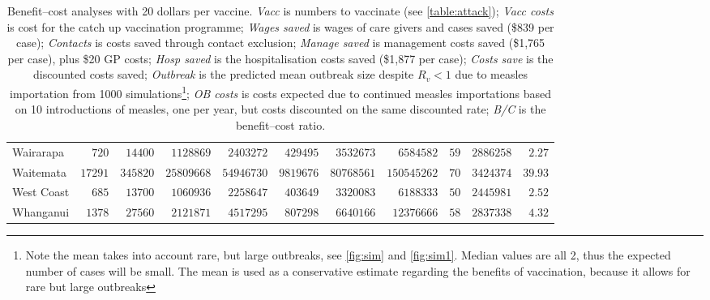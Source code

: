 \documentclass{article}
\begin{document}
\begin{table}
\begin{center}
\begin{tabular}{lrrrrrrrrrr}
Wairarapa&$  720$&$ 14400$&$ 1128869$&$ 2403272$&$  429495$&$ 3532673$&$  6584582$&$ 59$&$2886258$&$ 2.27$\tabularnewline
Waitemata&$17291$&$345820$&$25809668$&$54946730$&$ 9819676$&$80768561$&$150545262$&$ 70$&$3424374$&$39.93$\tabularnewline
West Coast&$  685$&$ 13700$&$ 1060936$&$ 2258647$&$  403649$&$ 3320083$&$  6188333$&$ 50$&$2445981$&$ 2.52$\tabularnewline
Whanganui&$ 1378$&$ 27560$&$ 2121871$&$ 4517295$&$  807298$&$ 6640166$&$ 12376666$&$ 58$&$2837338$&$ 4.32$\tabularnewline
\hline
\end{tabular}\end{center}\caption{Benefit--cost analyses with 20 dollars per vaccine. \textit{Vacc} is numbers to vaccinate (see \autoref{table:attack}); \textit{Vacc costs} is cost for the catch up vaccination programme; \textit{Wages saved} is wages of care givers and cases saved (\$839 per case); \textit{Contacts} is costs saved through contact exclusion; \textit{Manage saved} is management costs saved (\$1,765 per case), plus \$20 GP costs; \textit{Hosp saved} is the hospitalisation costs saved (\$1,877 per case); \textit{Costs save}  is the discounted costs saved; \textit{Outbreak}	is the predicted mean outbreak size despite $R_v < 1$ due to measles importation from 1000 simulations\footnote{Note the mean takes into account rare, but large outbreaks, see \autoref{fig:sim} and \autoref{fig:sim1}. Median values are all 2, thus the expected number of cases will be small. The mean is used as a conservative estimate regarding the benefits of vaccination, because it allows for rare but large outbreaks}; \textit{OB costs}	is costs expected due to continued measles importations based on 10 introductions of measles, one per year, but costs discounted on the same discounted rate; \textit{B/C} is the benefit--cost ratio.}
\label{table:cost20}
\end{table}
\end{document}
